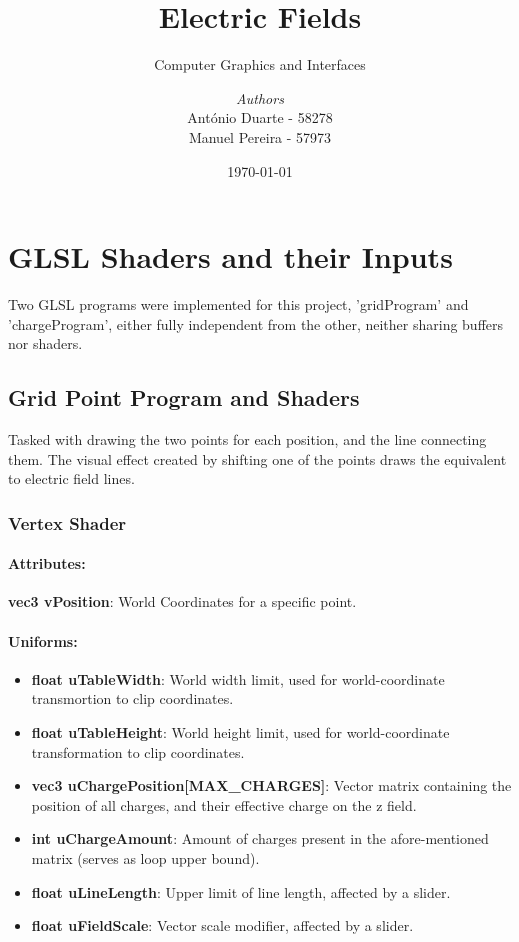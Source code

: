 \documentclass[10pt]{report}
\institute{Universidade Nova de Lisboa}
\title{Electric Fields}
\subtitle{Computer Graphics and Interfaces}
\author{\textit{Authors}\\António Duarte - 58278\\Manuel Pereira - 57973}
\date{\today}
\begin{document}
\maketitle
\romantableofcontents

\chapter{GLSL Shaders and their Inputs}

Two GLSL programs were implemented for this project, 'gridProgram' and 'chargeProgram', either fully independent from the other, neither sharing buffers nor shaders.
	
\section{Grid Point Program and Shaders}

Tasked with drawing the two points for each position, and the line connecting them. The visual effect created by shifting one of the points draws the equivalent to electric field lines.

\subsection{Vertex Shader}

\subsubsection{Attributes:}

\textbf{vec3 vPosition}: World Coordinates for a specific point.

\subsubsection{Uniforms:}

\begin{itemize}
    \item \textbf{float uTableWidth}: World width limit, used for world-coordinate transmortion to clip coordinates.
    \item \textbf{float uTableHeight}: World height limit, used for world-coordinate transformation to clip coordinates.
    \item \textbf{vec3 uChargePosition[MAX\_CHARGES]}: Vector matrix containing the position of all charges, and their effective charge on the z field.
    \item \textbf{int uChargeAmount}: Amount of charges present in the afore-mentioned matrix (serves as loop upper bound).
    \item \textbf{float uLineLength}: Upper limit of line length, affected by a slider.
    \item \textbf{float uFieldScale}: Vector scale modifier, affected by a slider.
\end{itemize}
\end{document}
